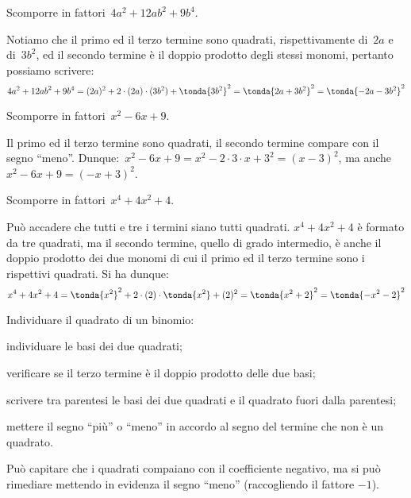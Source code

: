  \begin{esempio}
Scomporre in fattori~\(4a^{2}+12ab^{2}+9b^{4}\).

Notiamo che il primo ed il terzo termine sono quadrati, rispettivamente 
di~\(2a\) e di~\(3b^{2}\), ed il secondo termine è il doppio prodotto degli 
stessi 
monomi, pertanto possiamo scrivere:
\[4a^{2}+12{ab}^{2}+9b^{4}=(2a)^{2}+2 \cdot (2a) \cdot (3b^{2})+
  \tonda{3b^{2}}^{2}=\tonda{2a+3b^{2}}^{2}=\tonda{-2a-3b^{2}}^{2}\]
 \end{esempio}

 \begin{esempio}
Scomporre in fattori~\(x^{2}-6x+9\).

Il primo ed il terzo termine sono quadrati, il secondo termine compare con il 
segno ``meno''.
Dunque:~\(x^{2}-6x+9=x^{2}-2\cdot 3\cdot x+3^{2}=(x-3)^{2}\), 
ma anche~\(x^{2}-6x+9=(-x+3)^{2}\).
 \end{esempio}

 \begin{esempio}
Scomporre in fattori~\(x^{4}+4x^{2}+4\).

Può accadere che tutti e tre i termini siano tutti quadrati. 
\(x^{4}+4x^{2}+4\) è formato da tre quadrati, ma il secondo termine, quello 
di grado intermedio, è anche il doppio prodotto dei due monomi di cui il 
primo ed il terzo termine sono i rispettivi quadrati.
Si ha dunque:
\[x^{4}+4x^{2}+4=
  \tonda{x^{2}}^{2}+2 \cdot (2) \cdot \tonda{x^{2}}+(2)^{2}=
  \tonda{x^{2}+2}^{2}=\tonda{-x^{2}-2}^{2}\]
 \end{esempio}

\begin{procedura}
Individuare il quadrato di un binomio:
\begin{enumeratea}
\item individuare le basi dei due quadrati;
\item verificare se il terzo termine è il doppio prodotto delle due basi;
\item scrivere tra parentesi le basi dei due quadrati e il quadrato fuori 
 dalla parentesi;
\item mettere il segno ``più'' o ``meno'' in accordo al segno del termine che 
 non è un quadrato.
\end{enumeratea}
\end{procedura}

Può capitare che i quadrati compaiano con il coefficiente negativo, ma si può 
rimediare mettendo in evidenza il segno ``meno'' (raccogliendo il fattore 
\(-1\)).

